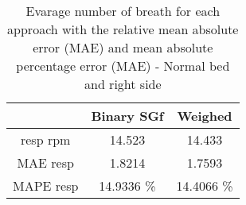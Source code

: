 \begin{table}[H]
    \centering
    \begin{tabular}{|c|c|c|}
    \hline 
    & Binary SGf & Weighed  \\ 
\hline
resp rpm & 14.523 &14.433 \\
    MAE resp & 1.8214 &     1.7593  \\ 
    MAPE resp & 14.9336 \% & 14.4066 \%\\ 


    \hline 
\end{tabular}

\caption{Evarage number of breath for each approach with the relative mean
absolute error (MAE) and mean absolute percentage error (MAE) - Normal bed
and right side}
\label{tab:RightNormalStillMetricssg}    
\end{table}